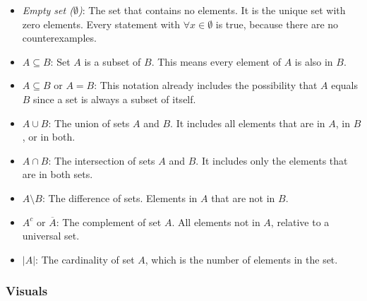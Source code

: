 \begin{itemize}

	\item \emph{Empty set (\(\emptyset\))}: The set that contains no elements. It is the unique set with 
	      zero elements. Every statement with \(\forall x \in \emptyset\) is true, because there are no counterexamples.

	\item \(A \subseteq B\): Set \(A\) is a subset of \(B\). This means every element of 
		  \(A\) is also in \(B\).

	\item \(A \subseteq B\) or \(A = B\): This notation already includes the possibility that \(A\) 
		  equals \(B\) since a set is always a subset of itself.

	\item \(A \cup B\): The union of sets \(A\) and \(B\). It includes all elements 
	      that are in \(A\), in \(B\), or in both.

	\item \(A \cap B\): The intersection of sets \(A\) and \(B\). It includes only the elements 
	      that are in both sets.

	\item \(A \setminus B\): The difference of sets. Elements in \(A\) that are not in \(B\).

	\item \(A^c\) or \(\overline{A}\): The complement of set \(A\). All elements not in \(A\), 
		  relative to  a universal set.

	\item \(|A|\): The cardinality of set \(A\), which is the number of elements in the set.

\end{itemize}
\smallskip

\subsubsection{Visuals}

